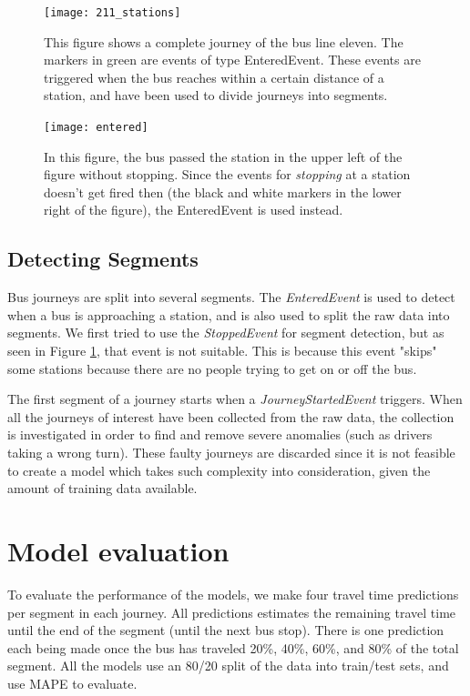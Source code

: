 \begin{figure}[!b]
\begin{minipage}{.5\textwidth}
	\texttt{[image: 211\_stations]}
	\caption{This figure shows a complete journey of the bus line eleven. The markers in green are events of type EnteredEvent. These events are triggered when the bus reaches within a certain distance of a station, and have been used to divide journeys into segments.}
	\label{fig:211_stations}
\end{minipage}
\hspace{5pt}
\begin{minipage}{.48\textwidth}
\texttt{[image: entered]}
\caption{In this figure, the bus passed the station in the upper left of the figure without stopping. Since the events for \textit{stopping} at a station doesn't get fired then (the black and white markers in the lower right of the figure), the EnteredEvent is used instead.}
\label{fig:entered}
\end{minipage}
\end{figure}


\subsection{Detecting Segments}
Bus journeys are split into several segments. The \textit{EnteredEvent} is used to detect when a bus is approaching a station, and is also used to split the raw data into segments.  We first tried to use the \textit{StoppedEvent} for segment detection, but as seen in Figure \ref{fig:entered}, that event is not suitable. This is because this event "skips" some stations because there are no people trying to get on or off the bus.

The first segment of a journey starts when a \textit{JourneyStartedEvent} triggers. When all the journeys of interest have been collected from the raw data, the collection is investigated in order to find and remove severe anomalies (such as drivers taking a wrong turn). These faulty journeys are discarded since it is not feasible to create a model which takes such complexity into consideration, given the amount of training data available.

\section{Model evaluation}
To evaluate the performance of the models, we make four travel time predictions per segment in each journey. All predictions estimates the remaining travel time until the end of the segment (until the next bus stop). There is one prediction each being made once the bus has traveled 20\%, 40\%, 60\%, and 80\% of the total segment. All the models use an 80/20 split of the data into train/test sets, and use MAPE to evaluate.

